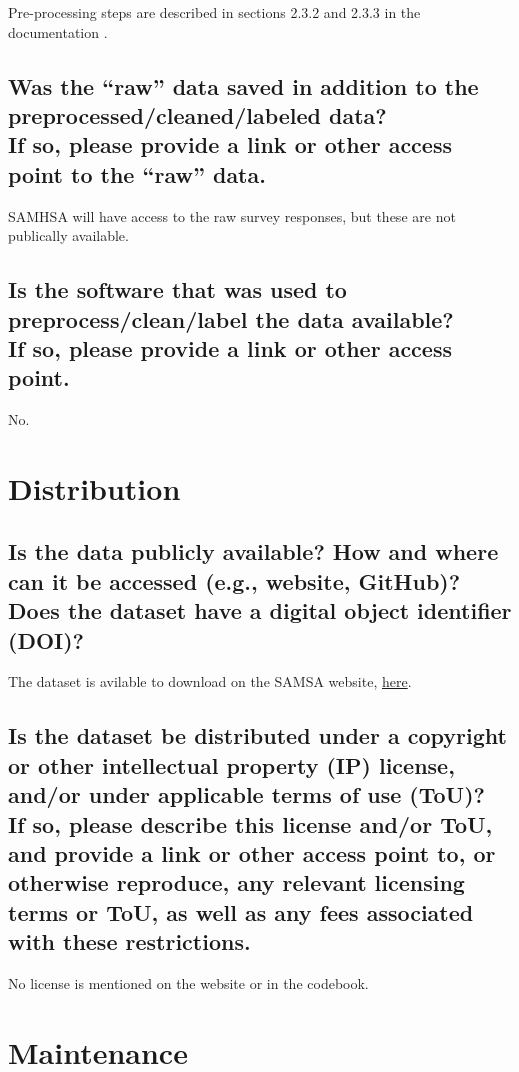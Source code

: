 \documentclass[letterpaper, 10 pt, conference]{ieeeconf}  %
\newcommand{\subtitle}[1]{{\\ \small \normalfont \color{purple} #1}}
\begin{document}
Pre-processing steps are described in sections 2.3.2 and 2.3.3 in the documentation \cite{nsduh_method}.

\subsection{Was the “raw” data saved in addition to the preprocessed/cleaned/labeled data? \subtitle{If so, please provide a link or other access point to the “raw” data. }}

SAMHSA will have access to the raw survey responses, but these are not publically available. 

\subsection{Is the software that was used to preprocess/clean/label the data available? \subtitle{If so, please provide a link or other access point.}}

No.

\section{Distribution}

\subsection{Is the data publicly available? How and where can it be accessed (e.g., website, GitHub)? \subtitle{Does the dataset have a digital object identifier (DOI)?}}

The dataset is avilable to download on the SAMSA website, \href{https://www.datafiles.samhsa.gov/dataset/national-survey-drug-use-and-health-2019-nsduh-2019-ds0001}{here}.

\subsection{Is the dataset be distributed under a copyright or other intellectual property (IP) license, and/or under applicable terms of use (ToU)? \subtitle{If so, please describe this license and/or ToU, and provide a link or other access point to, or otherwise reproduce, any relevant licensing terms or ToU, as well as any fees associated with these restrictions.}}

No license is mentioned on the website or in the codebook.

\section{Maintenance}
\end{document}
